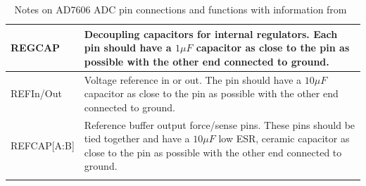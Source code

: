 \begin{singlespace}
\begin{longtable}[h]{|p{1.5in}|p{3.5in}|}
\hline
REGCAP	& Decoupling capacitors for internal regulators.  Each pin should have a $1\unit{\mu F}$ capacitor as close to the pin as possible with the other end connected to ground.\\
\hline
REFIn/Out	& Voltage reference in or out.  The pin should have a $10\unit{\mu F}$ capacitor as close to the pin as possible with the other end connected to ground.\\
\hline
REFCAP[A:B]	& Reference buffer output force/sense pins.  These pins should be tied together and have a $10\unit{\mu F}$ low ESR, ceramic capacitor as close to the pin as possible with the other end connected to ground.\\
\hline

\caption{Notes on AD7606 ADC pin connections and functions with information from~\cite{AD7606ds}\label{tab:AD7606Pins} }
\end{longtable}


\end{singlespace}
\renewcommand{\arraystretch}{1.0}

